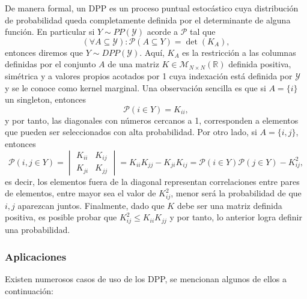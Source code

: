 De manera formal, un DPP es un proceso puntual estocástico cuya distribución de probabilidad queda completamente definida por el determinante de alguna función. En particular si $Y \sim PP(\mathcal{Y})$ acorde a $\mathcal{P}$ tal que 
\[ (\forall A \subseteq \mathcal{Y}): \mathcal{P}(A \subseteq Y) = \det(K_A) ,  \]
entonces diremos que $Y \sim DPP(\mathcal{Y})$. Aquí, $K_A$ es la restricción a las columnas definidas por el conjunto $A$ de una matriz $K \in \mathcal{M}_{N \times N} (\mathbb{R})$ definida positiva, simétrica y a valores propios acotados por 1 cuya indexación está definida por $\mathcal{Y}$ y se le conoce como kernel marginal. Una observación sencilla es que si $A = \{i\}$ un singleton, entonces 
\[ \mathcal{P}(i \in Y) = K_{ii} ,  \]
y por tanto, las diagonales con números cercanos a 1, corresponden a elementos que pueden ser seleccionados con alta probabilidad. Por otro lado, si $A = \{i,j\}$, entonces
	\[
	\mathcal{P}(i,j \in Y) = \begin{vmatrix}
    K_{ii} & K_{ij} \\ 
    K_{ji} & K_{jj}
    \end{vmatrix} = K_{ii}K_{jj} - K_{ji}K_{ij} = \mathcal{P}(i \in Y)\mathcal{P}(j \in Y) - K_{ij}^2 , 
	\] es decir, los elementos fuera de la diagonal representan correlaciones entre pares de elementos, entre mayor sea el valor de $K_{ij}^2$, menor será la probabilidad de que $i,j$ aparezcan juntos. Finalmente, dado que $K$ debe ser una matriz definida positiva, es posible probar que $K_{ij}^2 \leq K_{ii}K_{jj}$ y por tanto, lo anterior logra definir una probabilidad. 

\subsubsection{Aplicaciones }

Existen numerosos casos de uso de los DPP, se mencionan algunos de ellos a continuación: 

